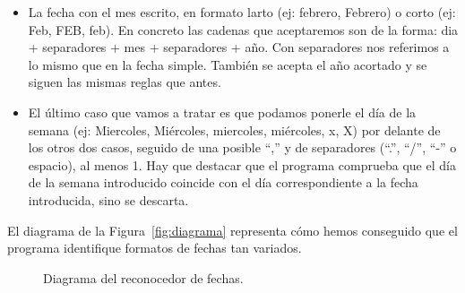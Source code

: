 \documentclass[12pt]{article}
\begin{document}
\begin{description}
\begin{itemize}
                \item La fecha con el mes escrito, en formato larto (ej: febrero, Febrero) o corto (ej: Feb, FEB, feb). En concreto las cadenas que aceptaremos son de la forma: dia + separadores + mes + separadores + año. Con separadores nos referimos a lo mismo que en la fecha simple. También se acepta el año acortado y se siguen las mismas reglas que antes.
                \item El último caso que vamos a tratar es que podamos ponerle el día de la semana (ej: Miercoles, Miércoles, miercoles, miércoles, x, X) por delante de los otros dos casos, seguido de una posible ``,'' y de separadores (``.'', ``/'', ``-'' o espacio), al menos 1. Hay que destacar que el programa comprueba que el día de la semana introducido coincide con el día correspondiente a la fecha introducida, sino se descarta. 
            \end{itemize}
            El diagrama de la Figura~\ref{fig:diagrama} representa cómo hemos conseguido que el programa identifique formatos de fechas tan variados.
            \begin{figure}[H]
                \centering
                \caption{Diagrama del reconocedor de fechas.}

\end{figure}
\end{description}
\end{document}
